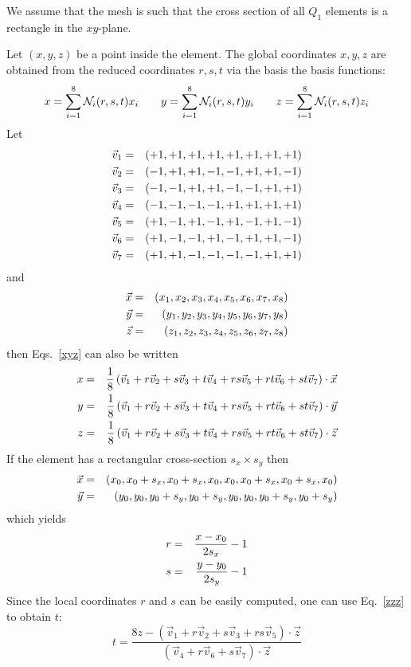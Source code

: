 We assume that the mesh is such that the cross section of all $Q_1$ elements 
is a rectangle in the $xy$-plane. 

Let $(x,y,z)$ be a point inside the element. 
The global coordinates $x,y,z$ are obtained from the 
reduced coordinates $r,s,t$ via the basis the basis functions:
\begin{eqnarray}
x=\sum_{i=1}^8 {\mathcal{N}}_i (r,s,t) x_i \qquad 
y=\sum_{i=1}^8 {\mathcal{N}}_i (r,s,t) y_i  \qquad 
z=\sum_{i=1}^8 {\mathcal{N}}_i (r,s,t) z_i \label{xyz}
\end{eqnarray}
Let 
\begin{eqnarray}
{\vec v}_1 &=& (+1,+1,+1,+1,+1,+1,+1,+1) \nonumber\\
{\vec v}_2 &=& (-1,+1,+1,-1,-1,+1,+1,-1) \nonumber\\
{\vec v}_3 &=& (-1,-1,+1,+1,-1,-1,+1,+1) \nonumber\\
{\vec v}_4 &=& (-1,-1,-1,-1,+1,+1,+1,+1) \nonumber\\
{\vec v}_5 &=& (+1,-1,+1,-1,+1,-1,+1,-1) \nonumber\\
{\vec v}_6 &=& (+1,-1,-1,+1,-1,+1,+1,-1) \nonumber\\
{\vec v}_7 &=& (+1,+1,-1,-1,-1,-1,+1,+1) \nonumber
\end{eqnarray}
and 
\begin{eqnarray}
{\vec x} &=& (x_1,x_2,x_3,x_4,x_5,x_6,x_7,x_8) \nonumber\\
{\vec y} &=& (y_1,y_2,y_3,y_4,y_5,y_6,y_7,y_8) \nonumber\\
{\vec z} &=& (z_1,z_2,z_3,z_4,z_5,z_6,z_7,z_8) \nonumber
\end{eqnarray}
then Eqs.~\eqref{xyz} can also be written
\begin{eqnarray}
x&=&\frac{1}{8} \left( {\vec v}_1 + r  {\vec v}_2 + s  {\vec v}_3 + t  {\vec v}_4 
                 + rs  {\vec v}_5 + rt {\vec v}_6 + st {\vec v}_7 \right) \cdot {\vec x} \nonumber\\ 
y&=&\frac{1}{8} \left( {\vec v}_1 + r  {\vec v}_2 + s  {\vec v}_3 + t  {\vec v}_4 
                 + rs  {\vec v}_5 + rt {\vec v}_6 + st {\vec v}_7 \right) \cdot {\vec y} \nonumber\\
z&=&\frac{1}{8} \left( {\vec v}_1 + r  {\vec v}_2 + s  {\vec v}_3 + t  {\vec v}_4 
                 + rs  {\vec v}_5 + rt {\vec v}_6 + st {\vec v}_7 \right) \cdot {\vec z} \label{zzz}
\end{eqnarray}
If the element has a rectangular cross-section $s_x \times s_y$ then 
\begin{eqnarray}
{\vec x} &=& (x_0,x_0+s_x,x_0+s_x,x_0,x_0,x_0+s_x,x_0+s_x,x_0) \nonumber\\
{\vec y} &=& (y_0,y_0,y_0+s_y,y_0+s_y,y_0,y_0,y_0+s_y,y_0+s_y) \nonumber
\end{eqnarray}
which yields
\begin{eqnarray}
r&=& \frac{x-x_0}{2s_x}-1  \nonumber\\
s&=& \frac{y-y_0}{2s_y}-1  \nonumber
\end{eqnarray}
Since the local coordinates $r$ and $s$ can be easily computed, one can use Eq.~\eqref{zzz} to obtain $t$:
\[
t=\frac{8z - ({\vec v}_1 + r {\vec v}_2 + s {\vec v}_3 + rs  {\vec v}_5 ) \cdot {\vec z}} 
{ ({\vec v}_4  + r  {\vec v}_6 + s  {\vec v}_7)  \cdot {\vec z} }
\]







